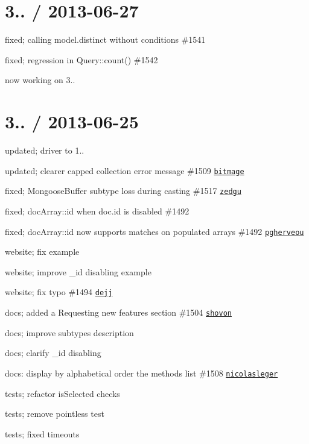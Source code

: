 \section*{3.. / 2013-\/06-\/27 }


\begin{DoxyItemize}
\item fixed; calling model.\+distinct without conditions \#1541
\item fixed; regression in Query\+::count() \#1542
\item now working on 3..
\end{DoxyItemize}

\section*{3.. / 2013-\/06-\/25 }


\begin{DoxyItemize}
\item updated; driver to 1..
\item updated; clearer capped collection error message \#1509 \href{https://github.com/bitmage}{\tt bitmage}
\item fixed; Mongoose\+Buffer subtype loss during casting \#1517 \href{https://github.com/zedgu}{\tt zedgu}
\item fixed; doc\+Array\+::id when doc.\+id is disabled \#1492
\item fixed; doc\+Array\+::id now supports matches on populated arrays \#1492 \href{https://github.com/pgherveou}{\tt pgherveou}
\item website; fix example
\item website; improve \+\_\+id disabling example
\item website; fix typo \#1494 \href{https://github.com/dejj}{\tt dejj}
\item docs; added a \textquotesingle{}Requesting new features\textquotesingle{} section \#1504 \href{https://github.com/shovon}{\tt shovon}
\item docs; improve subtypes description
\item docs; clarify \+\_\+id disabling
\item docs\+: display by alphabetical order the methods list \#1508 \href{https://github.com/nicolasleger}{\tt nicolasleger}
\item tests; refactor is\+Selected checks
\item tests; remove pointless test
\item tests; fixed timeouts
\end{DoxyItemize}

